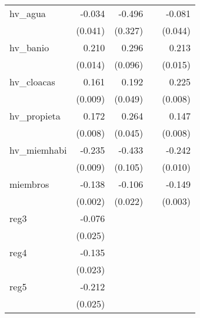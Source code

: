 {\begin{longtable}{l*{4}{D{.}{.}{-1}}}
\addlinespace
hv\_agua     &      -0.034         &      -0.496         &                     &      -0.081         \\
            &     (0.041)         &     (0.327)         &                     &     (0.044)         \\
\addlinespace
hv\_banio    &       0.210\sym{***}&       0.296\sym{**} &                     &       0.213\sym{***}\\
            &     (0.014)         &     (0.096)         &                     &     (0.015)         \\
\addlinespace
hv\_cloacas  &       0.161\sym{***}&       0.192\sym{***}&                     &       0.225\sym{***}\\
            &     (0.009)         &     (0.049)         &                     &     (0.008)         \\
\addlinespace
hv\_propieta &       0.172\sym{***}&       0.264\sym{***}&                     &       0.147\sym{***}\\
            &     (0.008)         &     (0.045)         &                     &     (0.008)         \\
\addlinespace
hv\_miemhabi &      -0.235\sym{***}&      -0.433\sym{***}&                     &      -0.242\sym{***}\\
            &     (0.009)         &     (0.105)         &                     &     (0.010)         \\
\addlinespace
miembros    &      -0.138\sym{***}&      -0.106\sym{***}&                     &      -0.149\sym{***}\\
            &     (0.002)         &     (0.022)         &                     &     (0.003)         \\
\addlinespace
reg3        &      -0.076\sym{**} &                     &                     &                     \\
            &     (0.025)         &                     &                     &                     \\
\addlinespace
reg4        &      -0.135\sym{***}&                     &                     &                     \\
            &     (0.023)         &                     &                     &                     \\
\addlinespace
reg5        &      -0.212\sym{***}&                     &                     &                     \\
            &     (0.025)         &                     &                     &                     \\

\end{longtable}}

